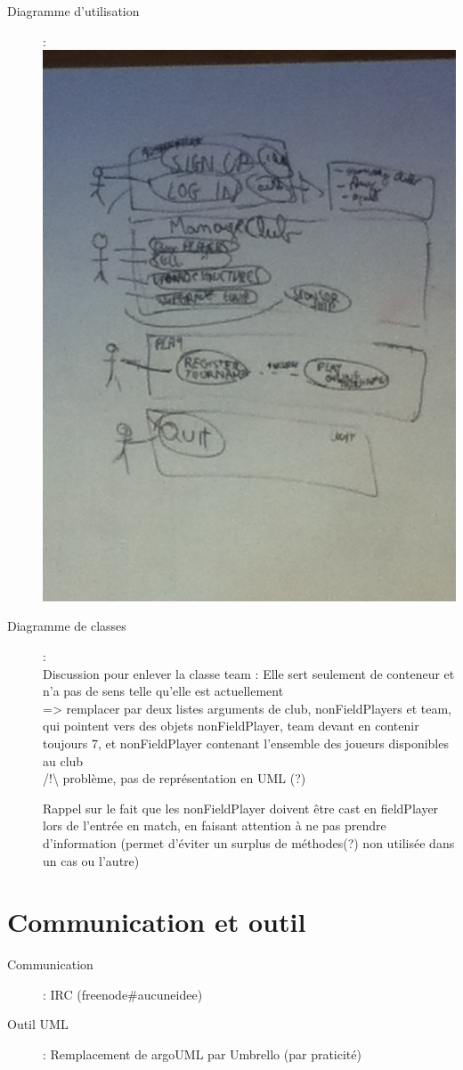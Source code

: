 \documentclass[a4paper,10pt]{article}
\begin{document}
\begin{description}
\item[\Large Diagramme d'utilisation] :\\
\includegraphics[angle=-90, scale=0.5]{Use_Case_Diagram.JPG}
\newpage

\item[Diagramme de classes] :\\
Discussion pour enlever la classe team : Elle sert seulement de conteneur et n'a pas de sens telle qu'elle est actuellement\\=> remplacer par deux listes arguments de club, nonFieldPlayers et team, qui pointent vers des objets nonFieldPlayer, team devant en contenir toujours 7, et nonFieldPlayer contenant l'ensemble des joueurs disponibles au club\\ /!\textbackslash{} problème, pas de représentation en UML (?)

Rappel sur le fait que les nonFieldPlayer doivent être cast en fieldPlayer lors de l'entrée en match, en faisant attention à ne pas prendre d'information (permet d'éviter un surplus de méthodes(?) non utilisée dans un cas ou l'autre)
\end{description}
\part*{Communication et outil}
\begin{description}
\item[Communication] : IRC (freenode\#aucuneidee)
\item[Outil UML] : Remplacement de argoUML par Umbrello (par praticité)
\end{description}
\end{document}
